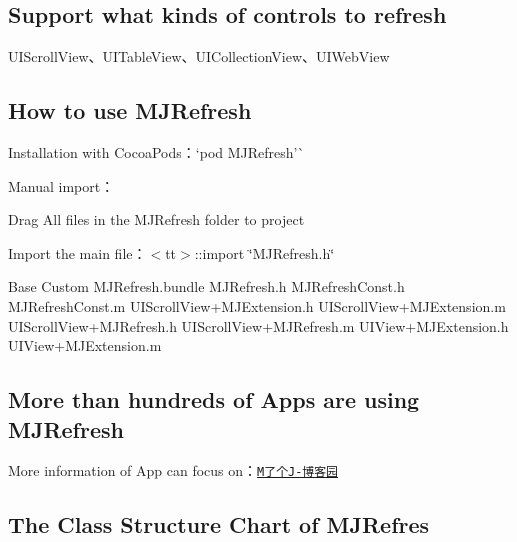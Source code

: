\subsection*{Support what kinds of controls to refresh}


\begin{DoxyItemize}
\item {\ttfamily U\+I\+Scroll\+View}、{\ttfamily U\+I\+Table\+View}、{\ttfamily U\+I\+Collection\+View}、{\ttfamily U\+I\+Web\+View}
\end{DoxyItemize}

\subsection*{How to use M\+J\+Refresh}


\begin{DoxyItemize}
\item Installation with Cocoa\+Pods：`pod \textquotesingle{}M\+J\+Refresh'\`{}
\item Manual import：
\begin{DoxyItemize}
\item Drag All files in the {\ttfamily M\+J\+Refresh} folder to project
\item Import the main file：$<$tt$>$\+::import \char`\"{}\+M\+J\+Refresh.\+h\char`\"{}
\end{DoxyItemize}
\end{DoxyItemize}


\begin{DoxyCode}
Base                        Custom
MJRefresh.bundle            MJRefresh.h
MJRefreshConst.h            MJRefreshConst.m
UIScrollView+MJExtension.h  UIScrollView+MJExtension.m
UIScrollView+MJRefresh.h    UIScrollView+MJRefresh.m
UIView+MJExtension.h        UIView+MJExtension.m
\end{DoxyCode}


\subsection*{More than hundreds of Apps are using M\+J\+Refresh}


\begin{DoxyItemize}
\item More information of App can focus on：\href{http://www.cnblogs.com/mjios/p/4409853.html}{\tt M了个\+J-\/博客园}
\end{DoxyItemize}

\subsection*{The Class Structure Chart of M\+J\+Refres}


